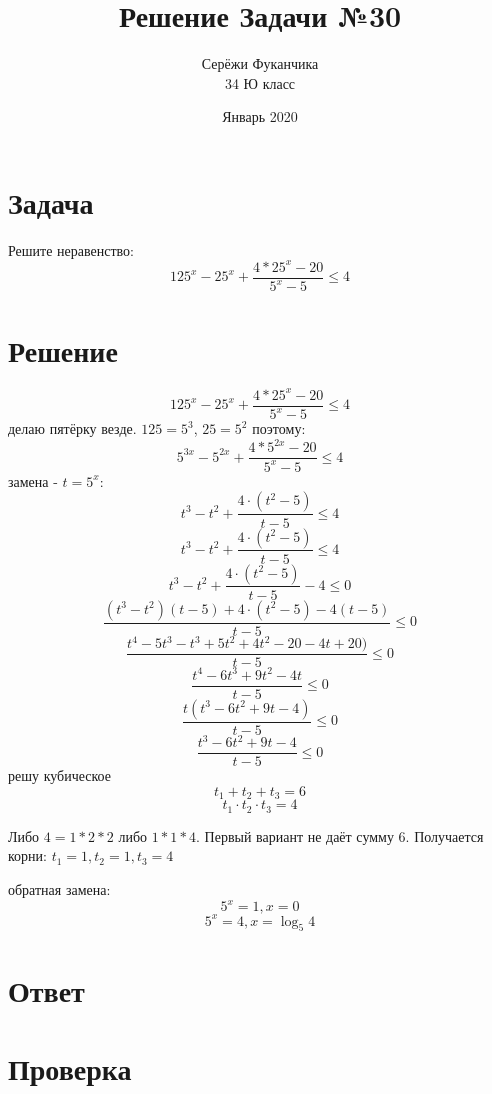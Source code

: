 \documentclass{article}
\title{Решение Задачи №30}
\author{Серёжи Фуканчика\\34 Ю класс}
\date{Январь 2020}
\begin{document}
\maketitle

\section{Задача}
Решите неравенство:
$$125^x-25^x+\frac{4*25^x-20}{5^x-5}\leq{}4$$

\section{Решение}
$$125^x-25^x+\frac{4*25^x-20}{5^x-5}\leq{}4$$
делаю пятёрку везде. $125=5^3$, $25=5^2$ поэтому:
$$5^{3x}-5^{2x}+\frac{4*5^{2x}-20}{5^x-5}\leq{}4$$
замена - $t=5^x$:
$$t^3-t^2+\frac{4\cdot{}(t^2-5)}{t-5}\leq{}4$$
$$t^3-t^2+\frac{4\cdot{}(t^2-5)}{t-5}\leq{}4$$
$$t^3-t^2+\frac{4\cdot{}(t^2-5)}{t-5}-4\leq{}0$$
$$\frac{(t^3-t^2)(t-5)+4\cdot{}(t^2-5)-4(t-5)}{t-5}\leq{}0$$
$$\frac{t^4-5t^3-t^3+5t^2+4t^2-20-4t+20)}{t-5}\leq{}0$$
$$\frac{t^4-6t^3+9t^2-4t}{t-5}\leq{}0$$
$$\frac{t(t^3-6t^2+9t-4)}{t-5}\leq{}0$$
$$\frac{t^3-6t^2+9t-4}{t-5}\leq{}0$$
решу кубическое
$$t_1+t_2+t_3=6$$
$$t_1\cdot{}t_2\cdot{}t_3=4$$

Либо $4=1*2*2$ либо $1*1*4$. Первый вариант не даёт сумму $6$. Получается корни:
$t_1=1, t_2=1, t_3=4$

обратная замена:
$$5^x=1, x=0$$
$$5^x=4, x=\log_5{4}$$

\section{Ответ}

\section{Проверка}
\end{document}
